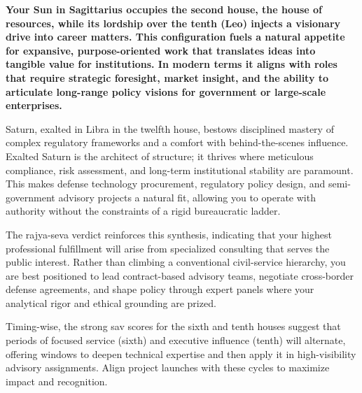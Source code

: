 
\label{topic48}

{\fontsize{9.5}{13.8}\selectfont\bfseries\color{DeepSlate} Your Sun in Sagittarius occupies the second house, the house of resources, while its lordship over the tenth (Leo) injects a visionary drive into career matters. This configuration fuels a natural appetite for expansive, purpose-oriented work that translates ideas into tangible value for institutions. In modern terms it aligns with roles that require strategic foresight, market insight, and the ability to articulate long-range policy visions for government or large-scale enterprises.}\par\vspace{2mm}

{\fontsize{9}{13}\selectfont Saturn, exalted in Libra in the twelfth house, bestows disciplined mastery of complex regulatory frameworks and a comfort with behind-the-scenes influence. Exalted Saturn is the architect of structure; it thrives where meticulous compliance, risk assessment, and long-term institutional stability are paramount. This makes defense technology procurement, regulatory policy design, and semi-government advisory projects a natural fit, allowing you to operate with authority without the constraints of a rigid bureaucratic ladder.}\par\vspace{1.8mm}

{\fontsize{9}{13}\selectfont The rajya-seva verdict reinforces this synthesis, indicating that your highest professional fulfillment will arise from specialized consulting that serves the public interest. Rather than climbing a conventional civil-service hierarchy, you are best positioned to lead contract-based advisory teams, negotiate cross-border defense agreements, and shape policy through expert panels where your analytical rigor and ethical grounding are prized.}\par\vspace{1.8mm}

{\fontsize{9}{13}\selectfont Timing-wise, the strong sav scores for the sixth and tenth houses suggest that periods of focused service (sixth) and executive influence (tenth) will alternate, offering windows to deepen technical expertise and then apply it in high-visibility advisory assignments. Align project launches with these cycles to maximize impact and recognition.}\par\vspace{1.8mm}

